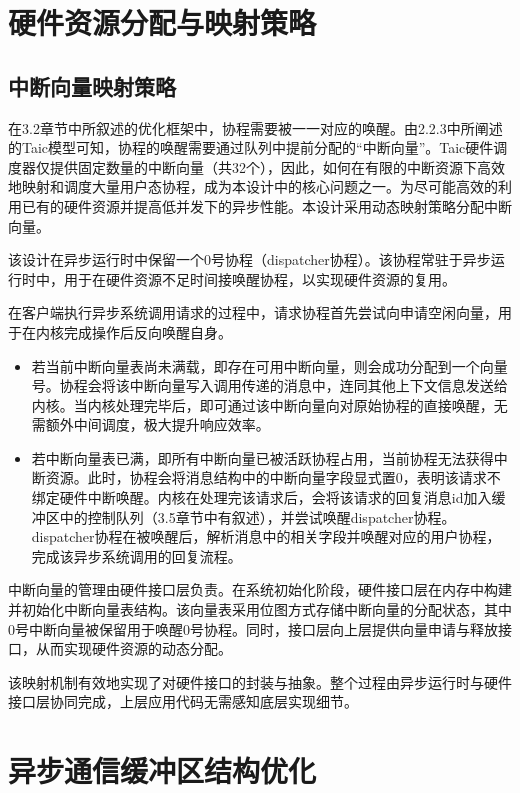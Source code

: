 \section{硬件资源分配与映射策略}

\subsection{中断向量映射策略}\label{sec:intrdesign}

在3.2章节中所叙述的优化框架中，协程需要被一一对应的唤醒。由2.2.3中所阐述的Taic模型可知，协程的唤醒需要通过队列中提前分配的“中断向量”。Taic硬件调度器仅提供固定数量的中断向量（共32个），因此，如何在有限的中断资源下高效地映射和调度大量用户态协程，成为本设计中的核心问题之一。为尽可能高效的利用已有的硬件资源并提高低并发下的异步性能。本设计采用动态映射策略分配中断向量。

该设计在异步运行时中保留一个0号协程（dispatcher协程）。该协程常驻于异步运行时中，用于在硬件资源不足时间接唤醒协程，以实现硬件资源的复用。

在客户端执行异步系统调用请求的过程中，请求协程首先尝试向申请空闲向量，用于在内核完成操作后反向唤醒自身。

\begin{itemize}
  \item 若当前中断向量表尚未满载，即存在可用中断向量，则会成功分配到一个向量号。协程会将该中断向量写入调用传递的消息中，连同其他上下文信息发送给内核。当内核处理完毕后，即可通过该中断向量向对原始协程的直接唤醒，无需额外中间调度，极大提升响应效率。

  \item 若中断向量表已满，即所有中断向量已被活跃协程占用，当前协程无法获得中断资源。此时，协程会将消息结构中的中断向量字段显式置0，表明该请求不绑定硬件中断唤醒。内核在处理完该请求后，会将该请求的回复消息id加入缓冲区中的控制队列（3.5章节中有叙述），并尝试唤醒dispatcher协程。dispatcher协程在被唤醒后，解析消息中的相关字段并唤醒对应的用户协程，完成该异步系统调用的回复流程。
\end{itemize}

中断向量的管理由硬件接口层负责。在系统初始化阶段，硬件接口层在内存中构建并初始化中断向量表结构。该向量表采用位图方式存储中断向量的分配状态，其中0号中断向量被保留用于唤醒0号协程。同时，接口层向上层提供向量申请与释放接口，从而实现硬件资源的动态分配。

该映射机制有效地实现了对硬件接口的封装与抽象。整个过程由异步运行时与硬件接口层协同完成，上层应用代码无需感知底层实现细节。

\section{异步通信缓冲区结构优化}\label{sec:buffer}

